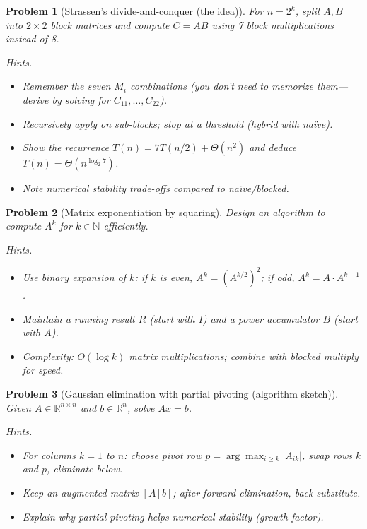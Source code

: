 \documentclass[11pt]{article}
\theoremstyle{upright}
\newtheorem{problem}{Problem}
\begin{document}
\begin{problem}[Strassen’s divide-and-conquer (the idea)]
For $n=2^k$, split $A,B$ into $2\times 2$ block matrices and compute $C=AB$ using 7 block multiplications instead of 8.

\textit{Hints.}
\begin{itemize}
  \item Remember the seven $M_i$ combinations (you don’t need to memorize them—derive by solving for $C_{11},\dots,C_{22}$).
  \item Recursively apply on sub-blocks; stop at a threshold (hybrid with naïve).
  \item Show the recurrence $T(n)=7T(n/2)+\Theta(n^2)$ and deduce $T(n)=\Theta(n^{\log_2 7})$.
  \item Note numerical stability trade-offs compared to naïve/blocked.
\end{itemize}
\end{problem}

\begin{problem}[Matrix exponentiation by squaring]
Design an algorithm to compute $A^k$ for $k\in\mathbb{N}$ efficiently.

\textit{Hints.}
\begin{itemize}
  \item Use binary expansion of $k$: if $k$ is even, $A^k=(A^{k/2})^2$; if odd, $A^k=A\cdot A^{k-1}$.
  \item Maintain a running result $R$ (start with $I$) and a power accumulator $B$ (start with $A$).
  \item Complexity: $O(\log k)$ matrix multiplications; combine with blocked multiply for speed.
\end{itemize}
\end{problem}

\begin{problem}[Gaussian elimination with partial pivoting (algorithm sketch)]
Given $A\in\mathbb{R}^{n\times n}$ and $b\in\mathbb{R}^n$, solve $Ax=b$.

\textit{Hints.}
\begin{itemize}
  \item For columns $k=1$ to $n$: choose pivot row $p=\arg\max_{i\ge k}|A_{ik}|$, swap rows $k$ and $p$, eliminate below.
  \item Keep an augmented matrix $[A\,|\,b]$; after forward elimination, back-substitute.
  \item Explain why partial pivoting helps numerical stability (growth factor).
\end{itemize}
\end{problem}
\end{document}

